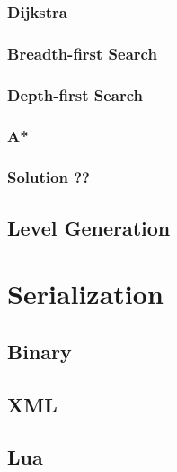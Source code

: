 \subsubsection{Dijkstra}

\subsubsection{Breadth-first Search}

\subsubsection{Depth-first Search}

\subsubsection{A*}

\subsubsection{Solution ??}

\subsection{Level Generation}

\section{Serialization}

\subsection{Binary}

\subsection{XML}

\subsection{Lua}
